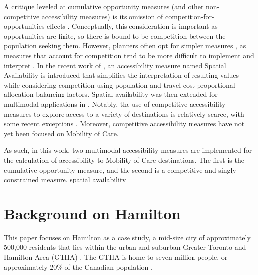 \documentclass[
  authoryear,
  preprint,
  3p]{elsarticle}
\begin{document}
A critique leveled at cumulative opportunity measures (and other
non-competitive accessibility measures) is its omission of
competition-for-opportunities effects
\citep{soukhovIntroducingSpatialAvailability2023, kelobonyeMeasuringAccessibilitySpatial2020, merlinDoesCompetitionMatter2017}.
Conceptually, this consideration is important as opportunities are
finite, so there is bound to be competition between the population
seeking them. However, planners often opt for simpler measures
\citep{kapatsilaResolvingAccessibilityDilemma2023}, as measures that
account for competition tend to be more difficult to implement and
interpret \citep{merlinDoesCompetitionMatter2017}. In the recent work of
\citet{soukhovIntroducingSpatialAvailability2023}, an accessibility
measure named Spatial Availability is introduced that simplifies the
interpretation of resulting values while considering competition using
population and travel cost proportional allocation balancing factors.
Spatial availability was then extended for multimodal applications in
\citet{soukhovMultimodalSpatialAvailability2024}. Notably, the use of
competitive accessibility measures to explore access to a variety of
destinations is relatively scarce, with some recent exceptions
\citep[e.g.,][]{kelobonyeMeasuringAccessibilitySpatial2020, singhCumulativeOpportunitybasedAccessibility2022}.
Moreover, competitive accessibility measures have not yet been focused
on Mobility of Care.

As such, in this work, two multimodal accessibility measures are
implemented for the calculation of accessibility to Mobility of Care
destinations. The first is the cumulative opportunity measure, and the
second is a competitive and singly-constrained measure, spatial
availability
\citep{soukhovIntroducingSpatialAvailability2023, soukhovMultimodalSpatialAvailability2024}.

\section{Background on Hamilton}\label{background-on-hamilton}

This paper focuses on Hamilton as a case study, a mid-size city of
approximately 500,000 residents that lies within the urban and suburban
Greater Toronto and Hamilton Area (GTHA)
\citep{transportationtomorrowsurvey2018}. The GTHA is home to seven
million people, or approximately 20\% of the Canadian population
\citep{cityoftoronto2021CensusPopulationa2022}.
\end{document}
